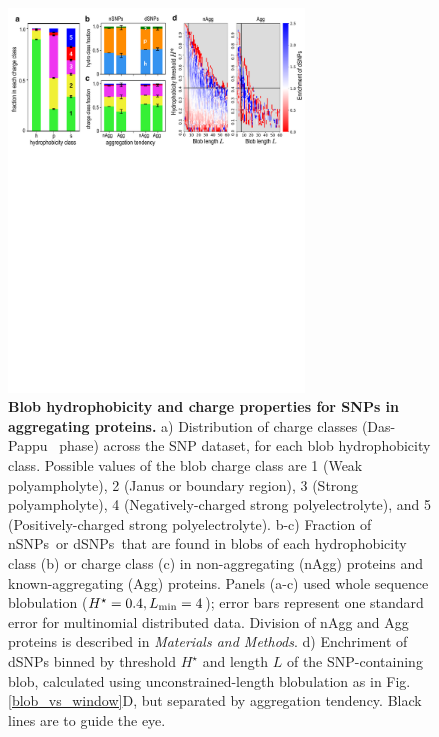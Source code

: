 \documentclass[9pt,twocolumn,twoside,lineno]{pnas-new}
\newcommand{\aucomment}[1]{}
\newcommand{\inserted}[1]{{#1}}
\newcommand{\dSNPs}{dSNPs~}
\newcommand{\nSNPs}{nSNPs~}
\newcommand{\hydrochar}{hydrophobicity class}
\newcommand{\chargechar}{charge class}
\newcommand{\Ht}{H^{\star}}
\newcommand{\Lmin}{L_{\rm min}}
\begin{document}
\begin{figure}
\includegraphics[width=0.7\textwidth,trim={0 0cm 0 0cm},clip]{fig4.pdf}
\caption{{\bf Blob hydrophobicity and charge properties for SNPs in aggregating proteins.} a) Distribution of \chargechar{}es (Das-Pappu~\cite{Das2013} phase) across the SNP dataset, for each blob \hydrochar. \inserted{Possible values of the blob \chargechar{} are 1 (Weak polyampholyte), 2 (Janus or boundary region), 3 (Strong polyampholyte), 4 (Negatively-charged strong polyelectrolyte), and 5 (Positively-charged strong polyelectrolyte).} b-c) Fraction of \nSNPs or \dSNPs that are found in blobs of each \hydrochar{} (b) or \chargechar{} (c) in non-aggregating (nAgg) proteins and known-aggregating (Agg) proteins. Panels (a-c) used whole sequence blobulation ($\Ht=0.4, \Lmin=4$); error bars represent one standard error for multinomial distributed data. Division of nAgg and Agg proteins is described in {\em Materials and Methods}. d) Enchriment of dSNPs binned by threshold $\Ht$ and length $L$ of the SNP-containing blob, calculated using unconstrained-length blobulation as in Fig. \ref{blob_vs_window}D, but separated by aggregation tendency. Black lines are to guide the eye. \aucomment{Panels e and f were removed to retain emphasis on the 2D distribution shift.}}
\label{agg_enrich} 
\end{figure}
\end{document}
